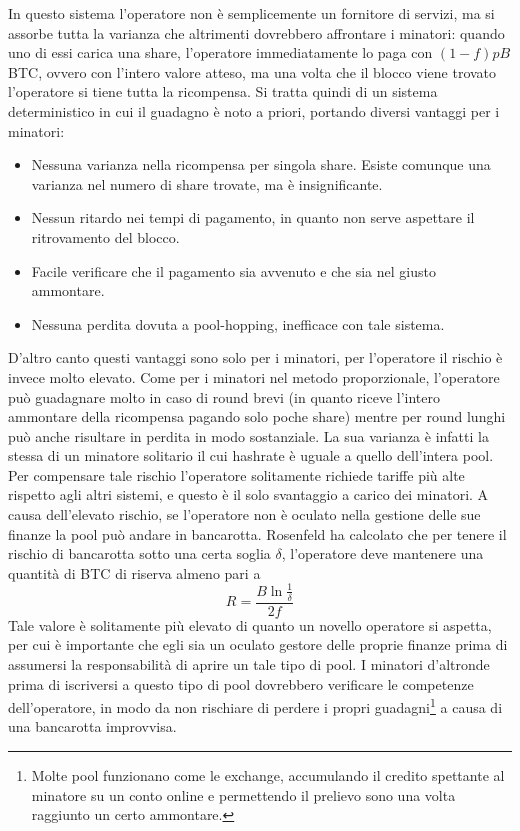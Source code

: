 In questo sistema l'operatore non è semplicemente un fornitore di servizi, ma si assorbe tutta la varianza che altrimenti dovrebbero affrontare i minatori: quando uno di essi carica una share, l'operatore immediatamente lo paga con $(1-f)pB$ BTC, ovvero con l'intero valore atteso, ma una volta che il blocco viene trovato l'operatore si tiene tutta la ricompensa.
Si tratta quindi di un sistema deterministico in cui il guadagno è noto a priori, portando diversi vantaggi per i minatori:
\begin{itemize}
    \item Nessuna varianza nella ricompensa per singola share. Esiste comunque una varianza nel numero di share trovate, ma è insignificante.
    \item Nessun ritardo nei tempi di pagamento, in quanto non serve aspettare il ritrovamento del blocco.
    \item Facile verificare che il pagamento sia avvenuto e che sia nel giusto ammontare.
    \item Nessuna perdita dovuta a pool-hopping, inefficace con tale sistema.
\end{itemize}
D'altro canto questi vantaggi sono solo per i minatori, per l'operatore il rischio è invece molto elevato. Come per i minatori nel metodo proporzionale, l'operatore può guadagnare molto in caso di round brevi (in quanto riceve l'intero ammontare della ricompensa pagando solo poche share) mentre per round lunghi può anche risultare in perdita in modo sostanziale. La sua varianza è infatti la stessa di un minatore solitario il cui hashrate è uguale a quello dell'intera pool. Per compensare tale rischio l'operatore solitamente richiede tariffe più alte rispetto agli altri sistemi, e questo è il solo svantaggio a carico dei minatori.
A causa dell'elevato rischio, se l'operatore non è oculato nella gestione delle sue finanze la pool può andare in bancarotta. Rosenfeld ha calcolato che per tenere il rischio di bancarotta sotto una certa soglia $\delta$, l'operatore deve mantenere una quantità di BTC di riserva almeno pari a
\[R = \frac{B \ln\frac{1}{\delta} }{2f}\]
Tale valore è solitamente più elevato di quanto un novello operatore si aspetta, per cui è importante che egli sia un oculato gestore delle proprie finanze prima di assumersi la responsabilità di aprire un tale tipo di pool. I minatori d'altronde prima di iscriversi a questo tipo di pool dovrebbero verificare le competenze dell'operatore, in modo da non rischiare di perdere i propri guadagni\footnote{Molte pool funzionano come le exchange, accumulando il credito spettante al minatore su un conto online e permettendo il prelievo sono una volta raggiunto un certo ammontare.} a causa di una bancarotta improvvisa.

